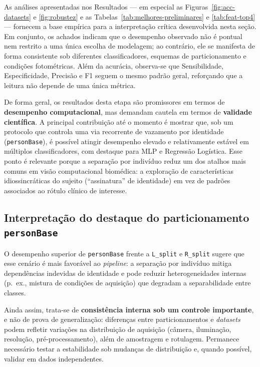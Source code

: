 \documentclass[11pt,a4paper]{article}
\begin{document}
As análises apresentadas nos Resultados --- em especial as Figuras~\ref{fig:acc-datasets} e \ref{fig:robustez} e as Tabelas~\ref{tab:melhores-preliminares} e \ref{tab:feat-top4} --- fornecem a base empírica
para a interpretação crítica desenvolvida nesta seção. Em conjunto, os achados
indicam que o desempenho observado não é pontual nem restrito a uma única escolha
de modelagem; ao contrário, ele se manifesta de forma consistente sob diferentes
classificadores, esquemas de particionamento e condições fotométricas. Além da
acurácia, observa-se que Sensibilidade, Especificidade, Precisão e F1 seguem o
mesmo padrão geral, reforçando que a leitura não depende de uma única métrica.

De forma geral, os resultados desta etapa são promissores em termos de
\textbf{desempenho computacional}, mas demandam cautela em termos de
\textbf{validade científica}. A principal contribuição até o momento é mostrar
que, sob um protocolo que controla uma via recorrente de vazamento por identidade
(\texttt{personBase}), é possível atingir desempenho elevado e relativamente estável
em múltiplos classificadores, com destaque para MLP e Regressão Logística. Esse
ponto é relevante porque a separação por indivíduo reduz um dos atalhos mais
comuns em visão computacional biomédica: a exploração de características
idiossincráticas do sujeito (``assinatura'' de identidade) em vez de padrões
associados ao rótulo clínico de interesse.

\subsection{Interpretação do destaque do particionamento \texttt{personBase}}
O desempenho superior de \texttt{personBase} frente a \texttt{L\_split} e \texttt{R\_split} sugere que esse cenário é mais favorável ao \textit{pipeline}: a separação por indivíduo mitiga dependências indevidas de identidade e pode reduzir heterogeneidades internas (p.\ ex., mistura de condições de aquisição) que degradam a separabilidade entre classes.

Ainda assim, trata-se de \textbf{consistência interna sob um controle importante}, e não de prova de generalização: diferenças entre particionamentos e \textit{datasets} podem refletir variações na distribuição de aquisição (câmera, iluminação, resolução, pré-processamento), além de amostragem e rotulagem. Permanece necessário testar a estabilidade sob mudanças de distribuição e, quando possível, validar em dados independentes.
\end{document}
